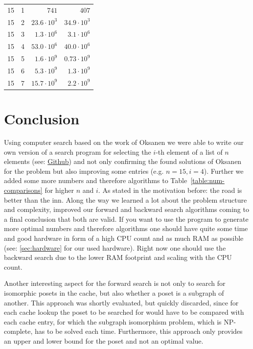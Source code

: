 \documentclass[twoside,leqno,twocolumn]{article}
\begin{document}
\begin{table}[!t]
\begin{tabular}{c|c|r|r}
    15  & 1   & $741$                   & $407$                    \\
    15  & 2   & $23.6 \cdot 10^3$       & $34.9 \cdot 10^3$        \\
    15  & 3   & $1.3 \cdot 10^6$        & $3.1 \cdot 10^6$         \\
    15  & 4   & $53.0 \cdot 10^6$       & $40.0 \cdot 10^6$        \\
    15  & 5   & $1.6 \cdot 10^9$        & $0.73 \cdot 10^9$        \\
    15  & 6   & $5.3 \cdot 10^9$        & $1.3 \cdot 10^9$         \\
    15  & 7   & $15.7 \cdot 10^9$       & $2.2 \cdot 10^9$         \\
  \end{tabular}
\end{table}


\section{Conclusion}

Using computer search based on the work of Oksanen we were able to write our own
version of a search program for selecting the $i$-th element of a list of $n$
elements (see: \href{https://github.com/JGDoerrer/selection_generator}{Github})
and not only confirming the found solutions of Oksanen for the problem but also
improving some entries (e.g. $n = 15, i = 4$). Further we added some more
numbers and therefore algorithms to Table~\ref{table:num-comparisons} for higher $n$ and $i$. As stated
in the motivation before: the road is better than the inn. Along the way we
learned a lot about the problem structure and complexity, improved our forward
and backward search algorithms coming to a final conclusion that both are valid.
If you want to use the program to generate more optimal numbers and therefore
algorithms one should have quite some time and good hardware in form of a high
CPU count and as much RAM as possible (see: \ref{sec:hardware} for our used
hardware).
Right now one should use the backward search due to the lower RAM footprint and
scaling with the CPU count.

Another interesting aspect for the forward search is not only to search for
isomorphic posets in the cache, but also whether a poset is a subgraph of
another. This approach was shortly evaluated, but quickly discarded, since for
each cache lookup the poset to be searched for would have to be compared with
each cache entry, for which the subgraph isomorphism problem, which is
NP-complete, has to be solved each time. Furthermore, this approach only
provides an upper and lower bound for the poset and not an optimal value.
\end{document}
